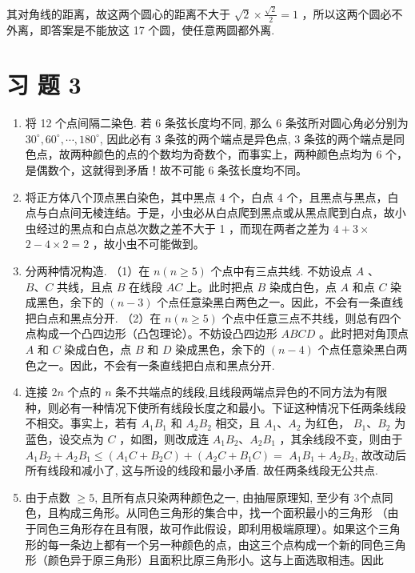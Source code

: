 \documentclass[10pt]{article}
\begin{document}
其对角线的距离，故这两个圆心的距离不大于 $\sqrt{2} \times \frac{\sqrt{2}}{2}=1$ ，所以这两个圆必不外离，即答案是不能放这 17 个圆，使任意两圆都外离.

\section{习 题 3}
\begin{enumerate}
  \item 将 12 个点间隔二染色. 若 6 条弦长度均不同, 那么 6 条弦所对圆心角必分别为 $30^{\circ}, 60^{\circ}, \cdots, 180^{\circ}$, 因此必有 3 条弦的两个端点是异色点, 3 条弦的两个端点是同色点，故两种颜色的点的个数均为奇数个，而事实上，两种颜色点均为 6 个，是偶数个，这就得到矛盾！故不可能 6 条弦长度均不同。
  \item 将正方体八个顶点黑白染色，其中黑点 4 个，白点 4 个，且黑点与黑点，白点与白点间无棱连结。于是，小虫必从白点爬到黑点或从黑点爬到白点，故小虫经过的黑点和白点总次数之差不大于 1 ，而现在两者之差为 $4+3 \times$ $2-4 \times 2=2$ ，故小虫不可能做到。
  \item 分两种情况构造. （1）在 $n(n \geqslant 5)$ 个点中有三点共线. 不妨设点 $A$ 、 $B 、 C$ 共线，且点 $B$ 在线段 $A C$ 上。此时把点 $B$ 染成白色，点 $A$ 和点 $C$ 染成黑色，余下的 $(n-3)$ 个点任意染黑白两色之一。因此，不会有一条直线把白点和黑点分开. （2）在 $n(n \geqslant 5)$ 个点中任意三点不共线，则总有四个点构成一个凸四边形（凸包理论）。不妨设凸四边形 $A B C D$ 。此时把对角顶点 $A$ 和 $C$ 染成白色，点 $B$ 和 $D$ 染成黑色，余下的 $(n-4)$ 个点任意染黑白两色之一。因此，不会有一条直线把白点和黑点分开.
  \item 连接 $2 n$ 个点的 $n$ 条不共端点的线段,且线段两端点异色的不同方法为有限种，则必有一种情况下使所有线段长度之和最小。下证这种情况下任两条线段不相交。事实上，若有 $A_{1} B_{1}$ 和 $A_{2} B_{2}$ 相交，且 $A_{1} 、 A_{2}$ 为红色， $B_{1} 、 B_{2}$ 为蓝色，设交点为 $C$ ，如图，则改成连 $A_{1} B_{2} 、 A_{2} B_{1}$ ，其余线段不变，则由于 $A_{1} B_{2}+A_{2} B_{1} \leqslant\left(A_{1} C+B_{2} C\right)+\left(A_{2} C+B_{1} C\right)=$ $A_{1} B_{1}+A_{2} B_{2}$, 故改动后所有线段和减小了, 这与所设的线段和最小矛盾. 故任两条线段无公共点.
  \item 由于点数 $\geqslant 5$, 且所有点只染两种颜色之一, 由抽屉原理知, 至少有 3个点同色，且构成三角形。从同色三角形的集合中，找一个面积最小的三角形 （由于同色三角形存在且有限，故可作此假设，即利用极端原理）。如果这个三角形的每一条边上都有一个另一种颜色的点，由这三个点构成一个新的同色三角形（颜色异于原三角形）且面积比原三角形小。这与上面选取相违。因此
\end{enumerate}
\end{document}
